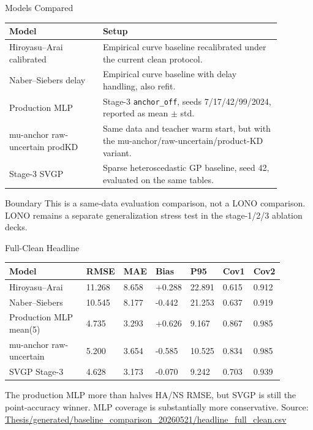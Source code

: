 \documentclass[aspectratio=169,11pt]{beamer}
\newcommand{\good}[1]{\textcolor{goodGreen}{#1}}
\newcommand{\blue}[1]{\textcolor{aaltoBlue}{#1}}
\newcommand{\src}[1]{\vfill{\tiny\textcolor{gray!70!black}{Source: \url{#1}}}}
\begin{document}
\begin{frame}{Models Compared}
\small
\begin{tabular}{L{0.30\linewidth}L{0.58\linewidth}}
\toprule
Model & Setup \\
\midrule
Hiroyasu--Arai calibrated & Empirical curve baseline recalibrated under the current clean protocol. \\
Naber--Siebers delay & Empirical curve baseline with delay handling, also refit. \\
Production MLP & Stage-3 \texttt{anchor\_off}, seeds 7/17/42/99/2024, reported as mean \(\pm\) std. \\
mu-anchor raw-uncertain prodKD & Same data and teacher warm start, but with the mu-anchor/raw-uncertain/product-KD variant. \\
Stage-3 SVGP & Sparse heteroscedastic GP baseline, seed 42, evaluated on the same tables. \\
\bottomrule
\end{tabular}

\vspace{0.7em}
\begin{block}{Boundary}
\footnotesize
This is a same-data evaluation comparison, not a LONO comparison. LONO remains a
separate generalization stress test in the stage-1/2/3 ablation decks.
\end{block}
\end{frame}

\begin{frame}{Full-Clean Headline}
\scriptsize
\begin{tabular}{L{0.29\linewidth}R{0.10\linewidth}R{0.10\linewidth}R{0.10\linewidth}R{0.10\linewidth}R{0.10\linewidth}R{0.10\linewidth}}
\toprule
Model & RMSE & MAE & Bias & P95 & Cov1 & Cov2 \\
\midrule
Hiroyasu--Arai & 11.268 & 8.658 & +0.288 & 22.891 & 0.615 & 0.912 \\
Naber--Siebers & 10.545 & 8.177 & -0.442 & 21.253 & 0.637 & 0.919 \\
\good{Production MLP mean(5)} & \good{4.735} & \good{3.293} & +0.626 & \good{9.167} & \good{0.867} & \good{0.985} \\
mu-anchor raw-uncertain & 5.200 & 3.654 & -0.585 & 10.525 & 0.834 & 0.985 \\
\blue{SVGP Stage-3} & \blue{4.628} & \blue{3.173} & -0.070 & 9.242 & 0.703 & 0.939 \\
\bottomrule
\end{tabular}

\vspace{0.6em}
\small
The production MLP more than halves HA/NS RMSE, but SVGP is still the
point-accuracy winner. MLP coverage is substantially more conservative.
\src{Thesis/generated/baseline_comparison_20260521/headline_full_clean.csv}
\end{frame}
\end{document}
